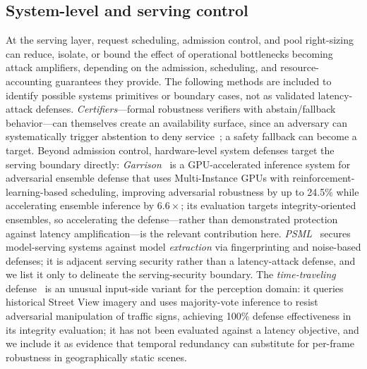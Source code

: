 \documentclass[acmsmall,screen,review,nonacm]{acmart}
\begin{document}
\subsection{System-level and serving control}
At the serving layer, request scheduling, admission control, and pool right-sizing~\cite{chen2026tokenbudget,zhang2025pd3f} can reduce, isolate, or bound the effect of operational bottlenecks becoming attack amplifiers, depending on the admission, scheduling, and resource-accounting guarantees they provide. The following methods are included to identify possible systems primitives or boundary cases, not as validated latency-attack defenses. \emph{Certifiers}---formal robustness verifiers with abstain/fallback behavior---can themselves create an availability surface, since an adversary can systematically trigger abstention to deny service~\cite{lorenz2021certifiers}; a safety fallback can become a target. Beyond admission control, hardware-level system defenses target the serving boundary directly: \emph{Garrison}~\cite{garrison2024} is a GPU-accelerated inference system for adversarial ensemble defense that uses Multi-Instance GPUs with reinforcement-learning-based scheduling, improving adversarial robustness by up to 24.5\% while accelerating ensemble inference by $6.6\times$; its evaluation targets integrity-oriented ensembles, so accelerating the defense---rather than demonstrated protection against latency amplification---is the relevant contribution here. \emph{PSML}~\cite{psml2023} secures model-serving systems against model \emph{extraction} via fingerprinting and noise-based defenses; it is adjacent serving security rather than a latency-attack defense, and we list it only to delineate the serving-security boundary. The \emph{time-traveling} defense~\cite{etim2024timetraveling} is an unusual input-side variant for the perception domain: it queries historical Street View imagery and uses majority-vote inference to resist adversarial manipulation of traffic signs, achieving 100\% defense effectiveness in its integrity evaluation; it has not been evaluated against a latency objective, and we include it as evidence that temporal redundancy can substitute for per-frame robustness in geographically static scenes.
\end{document}

